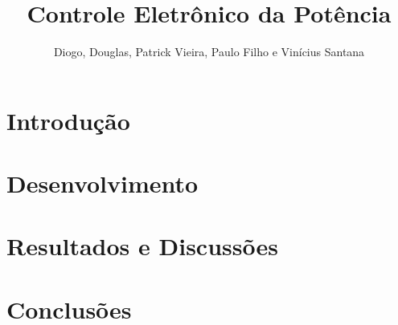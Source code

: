 \documentclass[12pt,a4paper]{article}
\title{Controle Eletrônico da Potência}
\author{Diogo, Douglas, Patrick Vieira, Paulo Filho e Vinícius Santana}
\affil{Universidade Estatual de Feira de Santana}
\begin{document}
\pagestyle{empty}

\maketitle

\begin{abstract}

\end{abstract}

\section{Introdução}



\section{Desenvolvimento}

\section{Resultados e Discussões}

\section{Conclusões}



\end{document}
